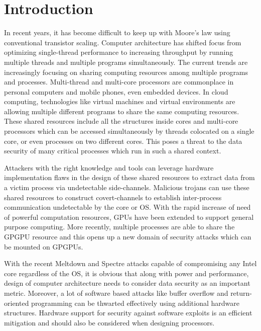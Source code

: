 \chapter{Introduction}

In recent years, it has become difficult to keep up with Moore's law using
conventional transistor scaling. Computer architecture has shifted
focus from optimizing single-thread performance to increasing throughput by
running multiple threads and multiple programs simultaneously.
The current trends are increasingly focusing on sharing
computing resources among multiple programs and processes.
Multi-thread and multi-core processors are commonplace in
personal computers and mobile phones, even embedded devices.
In cloud computing, technologies like virtual machines and virtual environments
are allowing multiple different programs to share the same computing resources.
These shared resources include all the structures inside cores and multi-core
processors which can be accessed simultaneously by threads colocated on a single
core, or even processes on two different cores.
This poses a threat to the data security of many critical
processes which run in such a shared context.

Attackers with the right knowledge and tools can leverage hardware
implementation flaws in the design of these shared resources
to extract data from a victim process via undetectable side-channels.
Malicious trojans can use these shared resources to construct
covert-channels to establish inter-process communication undetectable
by the core or OS. With the rapid increase of need of powerful computation
resources, GPUs have been extended to support general purpose computing.
More recently, multiple processes are able to share the GPGPU resource
and this opens up a new domain of security attacks which can be mounted on GPGPUs.

With the recent Meltdown  and Spectre 
attacks capable of compromising any Intel core regardless of the OS,
it is obvious that along with power and performance, design of
computer architecture needs to consider data security as an important metric.
Moreover, a lot of software based attacks like buffer overflow and return-oriented
programming can be thwarted effectively using additional hardware structures.
Hardware support for security against software exploits is an efficient mitigation
and should also be considered when designing processors.


